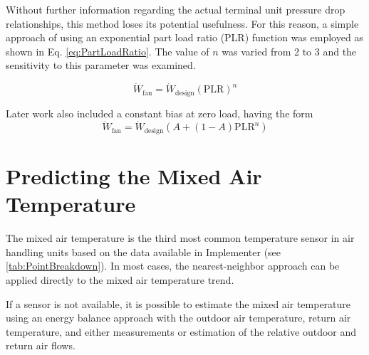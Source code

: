 Without further information regarding the actual terminal unit pressure
drop relationships, this method loses its potential usefulness. For this
reason, a simple approach of using an exponential part load ratio (PLR)
function was employed as shown in Eq. \ref{eq:PartLoadRatio}. The value
of \(n\) was varied from 2 to 3 and the sensitivity to this parameter was
examined.

\begin{equation}\label{eq:PartLoadRatio}
    \dot{W}_{\text{fan}} = \dot{W}_{\text{design}} \left(\text{PLR}\right)^n
\end{equation}

Later work also included a constant bias at zero load, having the form
\begin{equation}
    \dot{W}_{\text{fan}} = \dot{W}_{\text{design}} \left(A +
    \left(1-A\right)\text{PLR}^{n}\right)
\end{equation}

\section{Predicting the Mixed Air Temperature}

The mixed air temperature is the third most common temperature sensor in
air handling units based on the data available in Implementer
(see \tableref{} \ref{tab:PointBreakdown}). In most cases, the nearest-neighbor
approach can be applied directly to the mixed air temperature trend.

If a sensor is not available, it is possible to estimate the mixed air
temperature using an energy balance approach with the outdoor air temperature,
return air temperature, and either measurements or estimation of the relative
outdoor and return air flows.



